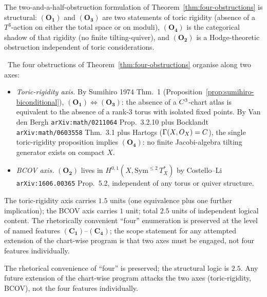 The two-and-a-half-obstruction formulation of
Theorem~\ref{thm:four-obstructions} is structural: $(\mathbf{O_1})$ and
$(\mathbf{O_3})$ are two statements of toric rigidity (absence of a
$T^3$-action on either the total space or on moduli), $(\mathbf{O_4})$
is the categorical shadow of that rigidity (no finite
tilting-quiver), and $(\mathbf{O_2})$ is a Hodge-theoretic obstruction
independent of toric considerations.

\begin{proposition}
\label{prop:structural-content}
\ClaimStatusProposition\
The four obstructions of Theorem~\ref{thm:four-obstructions} organise
along two axes:
\begin{itemize}[leftmargin=2em]
\item \emph{Toric-rigidity axis.} By Sumihiro 1974 Thm.~1
  (Proposition~\ref{prop:sumihiro-biconditional}),
  $(\mathbf{O_1}) \Leftrightarrow (\mathbf{O_3})$: the absence of a
  $C^3$-chart atlas is equivalent to the absence of a rank-$3$ torus
  with isolated fixed points. By Van den Bergh
  \texttt{arXiv:math/0211064} Prop.~3.2.10 plus Bocklandt
  \texttt{arXiv:math/0603558} Thm.~3.1 plus Hartogs
  ($\Gamma(X,O_X) = C$), the single toric-rigidity proposition
  implies $(\mathbf{O_4})$: no finite Jacobi-algebra tilting generator
  exists on compact $X$.
\item \emph{BCOV axis.} $(\mathbf{O_2})$ lives in
  $H^{0,1}(X, \mathrm{Sym}^{\leq 2}\,T_X^\ast)$ by Costello--Li
  \texttt{arXiv:1606.00365} Prop.~5.2, independent of any torus or
  quiver structure.
\end{itemize}
The toric-rigidity axis carries $1.5$ units (one equivalence plus one
further implication); the BCOV axis carries $1$ unit; total $2.5$
units of independent logical content. The rhetorically convenient
``four'' enumeration is preserved at the level of named features
$(\mathbf{C_1})$--$(\mathbf{C_4})$; the scope statement for any
attempted extension of the chart-wise program is that two axes must be
engaged, not four features individually.
\end{proposition}

The rhetorical convenience of ``four'' is preserved; the structural
logic is $2.5$. Any future extension of the chart-wise program attacks
the two axes (toric-rigidity, BCOV), not the four features
individually.

